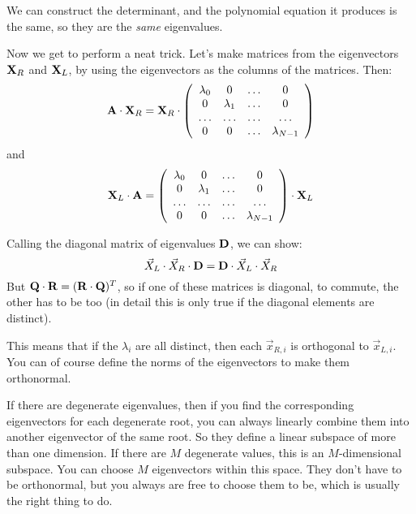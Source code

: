 \begin{answer}
We can construct the determinant, and the polynomial equation it
produces is the same, so they are the {\it same} eigenvalues.
\end{answer}

Now we get to perform a neat trick. Let's make matrices from the
eigenvectors ${\bf X}_R$ and ${\bf X}_L$, by using the eigenvectors as
the columns of the matrices.  Then:
\begin{equation}
  {\bf A}\cdot{\bf X}_R = {\bf X}_R \cdot
  \left(
  \begin{array}{cccc}
    \lambda_0 & 0 & \ldots & 0 \cr
    0 & \lambda_1 & \ldots & 0 \cr
    \ldots & \ldots & \ldots & \ldots \cr
    0 & 0 & \ldots & \lambda_{N-1} \cr
  \end{array}
  \right)
\end{equation}
and
\begin{equation}
  {\bf X}_L \cdot {\bf A} = 
  \left(
  \begin{array}{cccc}
    \lambda_0 & 0 & \ldots & 0 \cr
    0 & \lambda_1 & \ldots & 0 \cr
    \ldots & \ldots & \ldots & \ldots \cr
    0 & 0 & \ldots & \lambda_{N-1} \cr
  \end{array}
  \right) \cdot {\bf X}_L
\end{equation}

Calling the diagonal matrix of eigenvalues ${\bf D}$, we can show:
\begin{equation}
\vec{X}_L \cdot \vec{X}_R \cdot {\bf D} 
= {\bf D} \cdot \vec{X}_L \cdot \vec{X}_R
\end{equation}
But ${\bf Q}\cdot{\bf R} = ({\bf R}\cdot{\bf Q})^T$, so if one of
these matrices is diagonal, to commute, the other has to be too (in
detail this is only true if the diagonal elements are distinct). 

This means that if the $\lambda_i$ are all distinct, then each
$\vec{x}_{R,i}$ is orthogonal to $\vec{x}_{L,i}$. You can of course
define the norms of the eigenvectors to make them orthonormal. 

If there are degenerate eigenvalues, then if you find the
corresponding eigenvectors for each degenerate root, you can always
linearly combine them into another eigenvector of the same root. So
they define a linear subspace of more than one dimension. If there are
$M$ degenerate values, this is an $M$-dimensional subspace. You can
choose $M$ eigenvectors within this space. They don't have to be
orthonormal, but you always are free to choose them to be, which is
usually the right thing to do.

